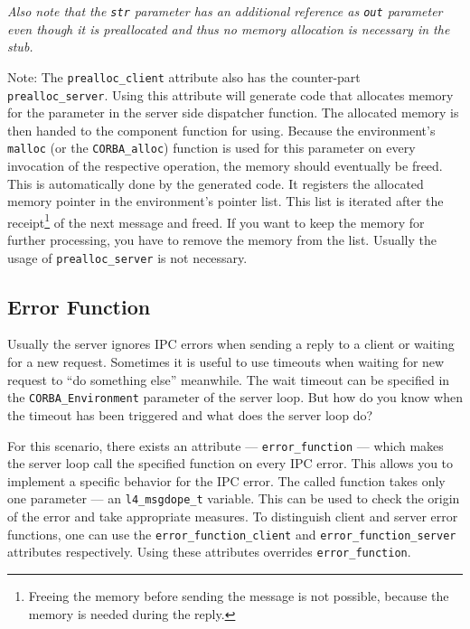 {\em Also note that the \verb|str| parameter has an additional reference as
\verb|out| parameter even though it is preallocated and thus no memory
allocation is necessary in the stub.}

Note: The \verb|prealloc_client| attribute also has the counter-part
\verb|prealloc_server|.  Using this attribute will generate code that
allocates memory for the parameter in the server side dispatcher function.
The allocated memory is then handed to the component function for using.
Because the environment's \verb|malloc| (or the \verb|CORBA_alloc|) function
is used for this parameter on every invocation of the respective operation,
the memory should eventually be freed.  This is automatically done by the
generated code.  It registers the allocated memory pointer in the
environment's pointer list.  This list is iterated after the
receipt\footnote{Freeing the memory before sending the message is not possible,
because the memory is needed during the reply.} of the next message and freed.
If you want to keep the memory for further processing, you have to remove the
memory from the list.  Usually the usage of \verb|prealloc_server| is not
necessary.

\subsection{Error Function}

Usually the server ignores IPC errors when sending a reply to a client or
waiting for a new request. Sometimes it is useful to use timeouts when waiting
for new request to ``do something else'' meanwhile. The wait timeout can be
specified in the \verb|CORBA_Environment| parameter of the server loop. But
how do you know when the timeout has been triggered and what does the server
loop do?

For this scenario, there exists an attribute --- \verb|error_function| ---
which makes the server loop call the specified function on every IPC error.
This allows you to implement a specific behavior for the IPC error. The called
function takes only one parameter --- an \verb|l4_msgdope_t| variable.  This
can be used to check the origin of the error and take appropriate measures.
To distinguish client and server error functions, one can use the
\verb|error_function_client| and \verb|error_function_server| attributes
respectively. Using these attributes overrides \verb|error_function|.


